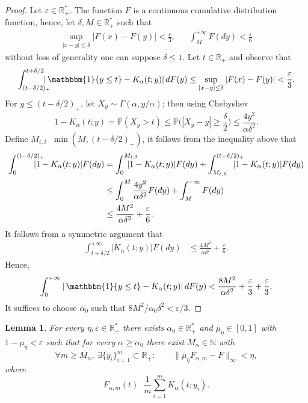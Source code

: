 \documentclass{article}
\newtheorem{lemma}[theorem]{Lemma}
\DeclareMathOperator*{\eqdef }{\,\stackrel{\text{def}}{=}\,}
\DeclareMathOperator{\IDF}{\mathbbm{1}}%
\newcommand{\R}{\mathbb{R}}
\begin{document}
\begin{proof}
Let $\varepsilon \in \R_{+}^*$. The function $F$ is a continuous cumulative distribution function, hence, let $\delta, M \in \R_+^*$ such that
\begin{align*}
\sup_{|x-y|\le\delta}|F(x)-F(y)|< \frac{\varepsilon}{3}, && \int_M^{+\infty} F(dy) < \frac{\varepsilon}{6}
\end{align*}
without loss of generality one can suppose $\delta \leq 1$. Let $t \in \R_{+}$ and observe that
\[ \int_{(t - \delta/2)_+}^{t + \delta/2} \hspace{-1em} | \IDF\{y \leq t\} -   K_\alpha(t;y) |\, dF(y) \leq \sup_{|x-y|\le\delta}|F(x)-F(y)| < \frac{\varepsilon}{3} .\]
For $y\le (t-\delta/2)_+$, let $X_y\sim\Gamma(\alpha,y/\alpha)$; then using Chebyshev
\[1-K_\alpha(t;y)=\mathbb P(X_y>t) \le \mathbb P \Big(|X_y-y| \geq \frac{\delta}{2} \Big) \le \frac{4y^2}{\alpha\delta^2}.\]
Define $M_{t,\delta} \eqdef \min(M,(t-\delta/2)_+)$, it follows from the inequality above that
\begin{align*}
\int_{0}^{(t-\delta/2)_+}\hspace{-1.5em}|1-K_\alpha(t;y)|F(dy) &= \int_{0}^{M_{t,\delta}}\hspace{-1.5em}|1-K_\alpha(t;y)|F(dy)
+ \int_{M_{t,\delta}}^{(t-\delta/2)_+} \hspace{-1.5em}|1-K_\alpha(t;y)| F(dy) \\
&\le \int_{0}^{M} \frac{4y^2}{\alpha\delta^2} F(dy) + \int_{M}^{+\infty} F(dy) \\
&\le \frac{4M^2}{\alpha\delta^2} + \frac{\varepsilon}{6}.
\end{align*}
It follows from a symmetric argument that
\begin{align*}
\int_{t+\delta/2}^{+\infty}|K_\alpha(t;y)|F(dy) &\le \frac{4M^2}{\alpha\delta^2} + \frac{\varepsilon}{6}.
\end{align*}
Hence,
\[ \int_{0}^{+\infty} | \IDF\{y \leq t\} -   K_\alpha(t;y) |\, dF(y) < \frac{8M^2}{\alpha\delta^2} +  \frac{\varepsilon}{3} + \frac{\varepsilon}{3}.\]
It suffices to choose $\alpha_0$ such that $8 M^2/\alpha_0 \delta^2 < \varepsilon / 3$.
\end{proof}

\begin{lemma}\label{lem:equalweight}
For every $\eta,\varepsilon \in \R_{+}^*$ there exists $\alpha_0 \in \R_{+}^*$ and $\mu_\eta \in [0,1]$ with $1-\mu_\eta<\varepsilon$ such that for every $\alpha\ge \alpha_0$ there exist $M_\alpha\in\mathbb N$ with
\[
\forall m\ge M_\alpha,\ \exists \{y_i\}_{i=1}^m\subset \R_+:\qquad
\bigl\|\mu_\eta F_{\alpha,m}-F\bigr\|_\infty<\eta,
\]
where
\[
F_{\alpha,m}(t)\eqdef \frac1m\sum_{i=1}^m K_\alpha(t;y_i).
\]
\end{lemma}
\end{document}
